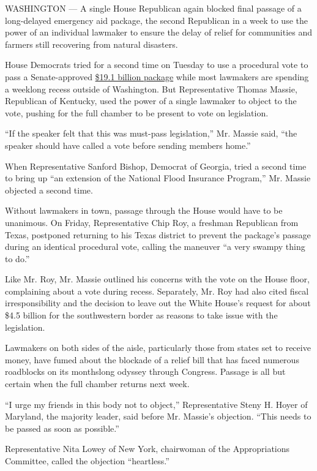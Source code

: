WASHINGTON --- A single House Republican again blocked final passage of
a long-delayed emergency aid package, the second Republican in a week to
use the power of an individual lawmaker to ensure the delay of relief
for communities and farmers still recovering from natural disasters.

House Democrats tried for a second time on Tuesday to use a procedural
vote to pass a Senate-approved
\href{https://www.nytimes.com/2019/05/23/us/politics/congress-disaster-relief.html}{\$19.1
billion package} while most lawmakers are spending a weeklong recess
outside of Washington. But Representative Thomas Massie, Republican of
Kentucky, used the power of a single lawmaker to object to the vote,
pushing for the full chamber to be present to vote on legislation.

``If the speaker felt that this was must-pass legislation,'' Mr. Massie
said, ``the speaker should have called a vote before sending members
home.''

When Representative Sanford Bishop, Democrat of Georgia, tried a second
time to bring up ``an extension of the National Flood Insurance
Program,'' Mr. Massie objected a second time.

Without lawmakers in town, passage through the House would have to be
unanimous. On Friday, Representative Chip Roy, a freshman Republican
from Texas, postponed returning to his Texas district to prevent the
package's passage during an identical procedural vote, calling the
maneuver ``a very swampy thing to do.''

Like Mr. Roy, Mr. Massie outlined his concerns with the vote on the
House floor, complaining about a vote during recess. Separately, Mr. Roy
had also cited fiscal irresponsibility and the decision to leave out the
White House's request for about \$4.5 billion for the southwestern
border as reasons to take issue with the legislation.

Lawmakers on both sides of the aisle, particularly those from states set
to receive money, have fumed about the blockade of a relief bill that
has faced numerous roadblocks on its monthslong odyssey through
Congress. Passage is all but certain when the full chamber returns next
week.

``I urge my friends in this body not to object,'' Representative Steny
H. Hoyer of Maryland, the majority leader, said before Mr. Massie's
objection. ``This needs to be passed as soon as possible.''

Representative Nita Lowey of New York, chairwoman of the Appropriations
Committee, called the objection ``heartless.''

